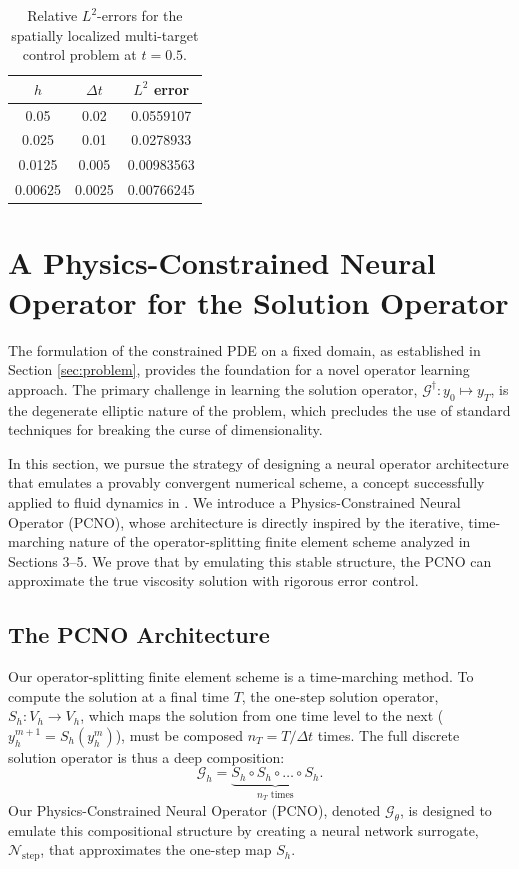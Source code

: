\documentclass[pdflatex,sn-mathphys-num]{sn-jnl}%
\theoremstyle{thmstyleone}%
\numberwithin{equation}{section}
\begin{document}
\begin{table}[ht]
\centering
\caption{Relative $L^2$-errors for the spatially localized multi-target control problem at $t = 0.5$.}
\label{tab:numerical_results_RD}
\begin{tabular}{c c c}
\toprule
$h$ & $\Delta t$ & {$L^2$ error} \\
\midrule
0.05    & 0.02   & 0.0559107 \\
0.025   & 0.01   & 0.0278933 \\
0.0125  & 0.005  & 0.00983563 \\
0.00625 & 0.0025 &  0.00766245\\
\bottomrule
\end{tabular}
\end{table}

\section{A Physics-Constrained Neural Operator for the Solution Operator}
\label{sec:pcno_framework}

The formulation of the constrained PDE on a fixed domain, as established in Section \ref{sec:problem}, provides the foundation for a novel operator learning approach. The primary challenge in learning the solution operator, $\mathcal{G}^\dagger: y_0 \mapsto y_T$, is the degenerate elliptic nature of the problem, which precludes the use of standard techniques for breaking the curse of dimensionality.

In this section, we pursue the strategy of designing a neural operator architecture that emulates a provably convergent numerical scheme, a concept successfully applied to fluid dynamics in \cite{kovachki2021universal}. We introduce a Physics-Constrained Neural Operator (PCNO), whose architecture is directly inspired by the iterative, time-marching nature of the operator-splitting finite element scheme analyzed in Sections 3--5. We prove that by emulating this stable structure, the PCNO can approximate the true viscosity solution with rigorous error control.

\subsection{The PCNO Architecture}

Our operator-splitting finite element scheme is a time-marching method. To compute the solution at a final time $T$, the one-step solution operator, $S_h: V_h \to V_h$, which maps the solution from one time level to the next ($y_h^{m+1} = S_h(y_h^m)$), must be composed $n_T = T/\Delta t$ times. The full discrete solution operator is thus a deep composition:
$$ \mathcal{G}_h = \underbrace{S_h \circ S_h \circ \dots \circ S_h}_{n_T \text{ times}}. $$
Our Physics-Constrained Neural Operator (PCNO), denoted $\mathcal{G}_\theta$, is designed to emulate this compositional structure by creating a neural network surrogate, $\mathcal{N}_{\text{step}}$, that approximates the one-step map $S_h$.
\end{document}
